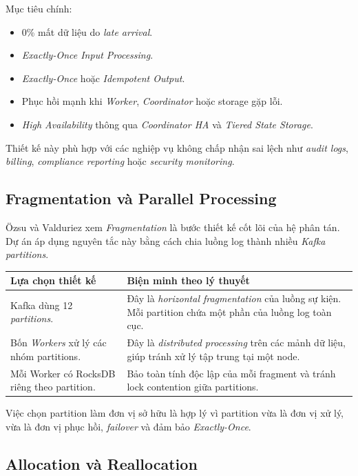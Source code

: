 \documentclass[12pt,a4paper]{article}
\begin{document}
Mục tiêu chính:

\begin{itemize}
    \item 0\% mất dữ liệu do \textit{late arrival}.
    \item \textit{Exactly-Once Input Processing}.
    \item \textit{Exactly-Once} hoặc \textit{Idempotent Output}.
    \item Phục hồi mạnh khi \textit{Worker}, \textit{Coordinator} hoặc storage gặp lỗi.
    \item \textit{High Availability} thông qua \textit{Coordinator HA} và \textit{Tiered State Storage}.
\end{itemize}

Thiết kế này phù hợp với các nghiệp vụ không chấp nhận sai lệch như \textit{audit logs}, \textit{billing}, \textit{compliance reporting} hoặc \textit{security monitoring}.

\subsection{Fragmentation và Parallel Processing}

Özsu và Valduriez xem \textit{Fragmentation} là bước thiết kế cốt lõi của hệ phân tán. Dự án áp dụng nguyên tắc này bằng cách chia luồng log thành nhiều \textit{Kafka partitions}.

\begin{longtable}{p{} p{}}
\toprule
\textbf{Lựa chọn thiết kế} & \textbf{Biện minh theo lý thuyết} \\
\midrule
\endhead
Kafka dùng 12 \textit{partitions}. & Đây là \textit{horizontal fragmentation} của luồng sự kiện. Mỗi partition chứa một phần của luồng log toàn cục. \\
Bốn \textit{Workers} xử lý các nhóm partitions. & Đây là \textit{distributed processing} trên các mảnh dữ liệu, giúp tránh xử lý tập trung tại một node. \\
Mỗi Worker có RocksDB riêng theo partition. & Bảo toàn tính độc lập của mỗi fragment và tránh lock contention giữa partitions. \\
\bottomrule
\end{longtable}

Việc chọn partition làm đơn vị sở hữu là hợp lý vì partition vừa là đơn vị xử lý, vừa là đơn vị phục hồi, \textit{failover} và đảm bảo \textit{Exactly-Once}.

\subsection{Allocation và Reallocation}
\end{document}
